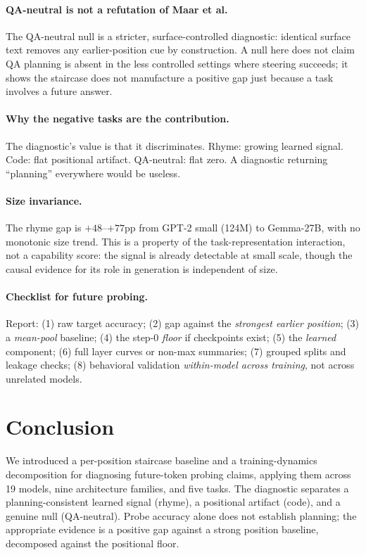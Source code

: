 \documentclass[11pt]{article}
\begin{document}
\paragraph{QA-neutral is not a refutation of Maar et al.} The QA-neutral null
is a stricter, surface-controlled diagnostic: identical surface text removes any
earlier-position cue by construction. A null here does not claim QA planning is
absent in the less controlled settings where steering succeeds; it shows the
staircase does not manufacture a positive gap just because a task involves a
future answer.

\paragraph{Why the negative tasks are the contribution.} The diagnostic's value
is that it discriminates. Rhyme: growing learned signal. Code: flat positional
artifact. QA-neutral: flat zero. A diagnostic returning ``planning'' everywhere
would be useless.

\paragraph{Size invariance.} The rhyme gap is $+48$--$+77$pp from GPT-2 small
(124M) to Gemma-27B, with no monotonic size trend. This is a property of the
task-representation interaction, not a capability score: the signal is already
detectable at small scale, though the causal evidence for its role in generation
is independent of size.

\paragraph{Checklist for future probing.} Report: (1) raw target accuracy;
(2) gap against the \emph{strongest earlier position}; (3) a \emph{mean-pool}
baseline; (4) the step-0 \emph{floor} if checkpoints exist; (5) the
\emph{learned} component; (6) full layer curves or non-max summaries;
(7) grouped splits and leakage checks; (8) behavioral validation
\emph{within-model across training}, not across unrelated models.

\section{Conclusion}

We introduced a per-position staircase baseline and a training-dynamics
decomposition for diagnosing future-token probing claims, applying them across
19 models, nine architecture families, and five tasks. The diagnostic separates
a planning-consistent learned signal (rhyme), a positional artifact (code), and
a genuine null (QA-neutral). Probe accuracy alone does not establish planning;
the appropriate evidence is a positive gap against a strong position baseline,
decomposed against the positional floor.
\end{document}
